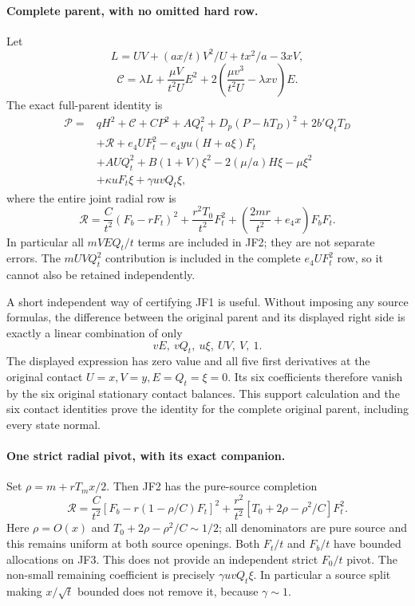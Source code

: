 \paragraph{Complete parent, with no omitted hard row.}
Let
\[
 L=UV+(ax/t)V^2/U+tx^2/a-3xV,
\]
\[
 \mathscr C=\lambda L+\frac{\mu V}{t^2U}E^2
                +2\left(\frac{\mu v^3}{t^2U}-\lambda xv\right)E.
\]
The exact full-parent identity is
\begin{align*}
 \mathcal P={}&qH^2+\mathscr C
 +CP^2+AQ_t^2+D_p(P-hT_D)^2+2b'Q_tT_D\\
 &+\mathscr R+e_4UF_t^2-e_4yu(H+a\xi)F_t\\
 &+AUQ_t^2+B(1+V)\xi^2
                 -2(\mu/a)H\xi-\mu\xi^2\\
 &+\kappa uF_t\xi+\gamma uvQ_t\xi,                 \tag{JF1}
\end{align*}
where the entire joint radial row is
\[
 \mathscr R=\frac C{t^2}(F_b-rF_t)^2
       +\frac{r^2T_0}{t^2}F_t^2
       +\left(\frac{2mr}{t^2}+e_4x\right)F_bF_t.    \tag{JF2}
\]
In particular all $mVEQ_t/t$ terms are included in JF2; they are not
separate errors. The $mUVQ_t^2$ contribution is included in the complete
$e_4UF_t^2$ row, so it cannot also be retained independently.

A short independent way of certifying JF1 is useful. Without imposing
any source formulas, the difference between the original parent and
its displayed right side is exactly a linear combination of only
\[
                       vE,\ vQ_t,\ u\xi,\ UV,\ V,\ 1.
\]
The displayed expression has zero value and all five first derivatives
at the original contact $U=x,V=y,E=Q_t=\xi=0$.
Its six coefficients therefore vanish by the six original stationary
contact balances. This support calculation and the six contact identities
prove the identity for the complete original parent, including every state normal.

\paragraph{One strict radial pivot, with its exact companion.}
Set $\rho=m+rT_mx/2$. Then JF2 has the pure-source completion
\[
 \mathscr R=\frac C{t^2}
       [F_b-r(1-\rho/C)F_t]^2
       +\frac{r^2}{t^2}[T_0+2\rho-\rho^2/C]F_t^2.  \tag{JF3}
\]
Here $\rho=O(x)$ and $T_0+2\rho-\rho^2/C\sim1/2$;
all denominators are pure source and this remains uniform at both
source openings. Both $F_t/t$ and $F_b/t$ have bounded allocations
on JF3. This does not provide an independent strict $F_0/t$ pivot.
The non-small remaining coefficient is precisely $\gamma uvQ_t\xi$.
In particular a source split making $x/\sqrt t$ bounded does not
remove it, because $\gamma\sim1$.

